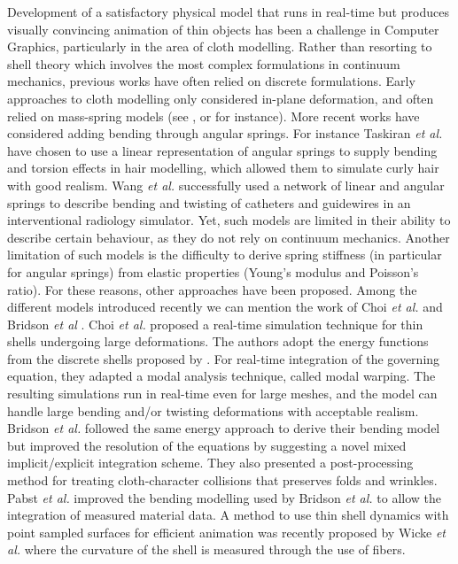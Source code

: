 \documentclass{llncs}
\begin{document}

Development of a satisfactory physical model that runs in real-time but produces visually convincing animation of thin objects has been a challenge in Computer Graphics, particularly in the area of cloth modelling. Rather than resorting to shell theory which involves the most complex formulations in continuum mechanics, previous works have often relied on discrete formulations. Early approaches to cloth modelling only considered in-plane deformation, and often relied on mass-spring models (see \cite{Provot95}, \cite{Hammer08} or \cite{Yu08} for instance). 
More recent works have considered adding bending through angular springs. For instance Taskiran \emph{et al.} \cite{Taskiran05} have chosen to use a linear representation of angular springs to supply bending and torsion effects in hair modelling, which allowed them to simulate curly hair with good realism. Wang \emph{et al.} \cite{Wang07} successfully used a network of linear and angular springs to describe bending and twisting of catheters and guidewires in an interventional radiology simulator. 
Yet, such models are limited in their ability to describe certain behaviour, as they do not rely on continuum mechanics. Another limitation of such models is the difficulty to derive spring stiffness (in particular for angular springs) from elastic properties (Young's modulus and Poisson's ratio). For these reasons, other approaches have been proposed. Among the different models introduced recently we can mention the work of Choi \emph{et al.} \cite{Choi07} and Bridson \emph{et al} \cite{Bridson03}. Choi \emph{et al.} proposed a real-time simulation technique for thin shells undergoing large deformations. The authors adopt the energy functions from the discrete shells proposed by \cite{Grinspun03}. For real-time integration of the governing equation, they adapted a modal analysis technique, called modal warping. The resulting simulations run in real-time even for large meshes, and the model can handle large bending and/or twisting deformations with acceptable realism. Bridson \emph{et al.} followed the same energy approach to derive their bending model but improved the resolution of the equations by suggesting a novel mixed implicit/explicit integration scheme. They also presented a post-processing method for treating cloth-character collisions that preserves folds and wrinkles. Pabst \emph{et al.} improved the bending modelling used by Bridson \emph{et al.} to allow the integration of measured material data. A method to use thin shell dynamics with point sampled surfaces for efficient animation was recently proposed by Wicke \emph{et al.} \cite{Wicke05} where the curvature of the shell is measured through the use of fibers.
\end{document}

